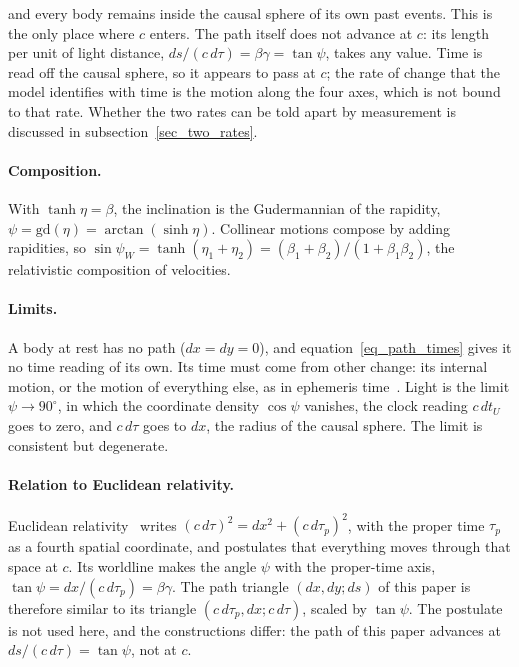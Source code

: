 \documentclass{iopjournal}
\begin{document}
and every body remains inside the causal sphere of its own past events. This is the only place where $c$ enters. The path itself does not advance at $c$: its length per unit of light distance, $ds/(c\,d\tau)=\beta\gamma=\tan\psi$, takes any value. Time is read off the causal sphere, so it appears to pass at $c$; the rate of change that the model identifies with time is the motion along the four axes, which is not bound to that rate. Whether the two rates can be told apart by measurement is discussed in subsection~\ref{sec_two_rates}.

\paragraph{Composition.} With $\tanh\eta=\beta$, the inclination is the Gudermannian of the rapidity, $\psi=\mathrm{gd}(\eta)=\arctan(\sinh\eta)$. Collinear motions compose by adding rapidities, so $\sin\psi_W=\tanh(\eta_1+\eta_2)=(\beta_1+\beta_2)/(1+\beta_1\beta_2)$, the relativistic composition of velocities.

\paragraph{Limits.} A body at rest has no path ($dx=dy=0$), and equation~\eqref{eq_path_times} gives it no time reading of its own. Its time must come from other change: its internal motion, or the motion of everything else, as in ephemeris time~\cite{Barbour2009}. Light is the limit $\psi\to90^\circ$, in which the coordinate density $\cos\psi$ vanishes, the clock reading $c\,dt_U$ goes to zero, and $c\,d\tau$ goes to $dx$, the radius of the causal sphere. The limit is consistent but degenerate.

\paragraph{Relation to Euclidean relativity.} Euclidean relativity~\cite{Montanus2001,Almeida2001} writes $(c\,d\tau)^2=dx^2+(c\,d\tau_p)^2$, with the proper time $\tau_p$ as a fourth spatial coordinate, and postulates that everything moves through that space at $c$. Its worldline makes the angle $\psi$ with the proper-time axis, $\tan\psi=dx/(c\,d\tau_p)=\beta\gamma$. The path triangle $(dx,dy;ds)$ of this paper is therefore similar to its triangle $(c\,d\tau_p,dx;c\,d\tau)$, scaled by $\tan\psi$. The postulate is not used here, and the constructions differ: the path of this paper advances at $ds/(c\,d\tau)=\tan\psi$, not at $c$.
\end{document}
